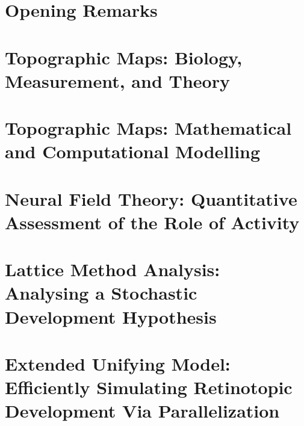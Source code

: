 \documentclass[fleqn,a4paper,10pt,twoside,titlepage]{report}
\theoremstyle{definition}
\begin{document}

               



   

\newpage

                 

\newpage
\tableofcontents
\listoffigures

\markboth{}{}

\newpage


\chapter{Opening Remarks}

\chapter{Topographic Maps: Biology, Measurement, and Theory \label{chapter:biology}}
     
\chapter{Topographic Maps: Mathematical and Computational Modelling \label{chapter:review}}
           
\chapter{Neural Field Theory: Quantitative Assessment of the Role of Activity  \label{chapter:neuralstdp}} 
          
\chapter{Lattice Method Analysis: Analysing a Stochastic Development Hypothesis \label{chapter:lattice}}

\chapter{Extended Unifying Model: Efficiently Simulating Retinotopic Development Via Parallelization \label{chapter:distributed}}

\end{document}
